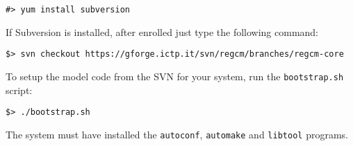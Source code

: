 \begin{verbatim}
#> yum install subversion
\end{verbatim}

If Subversion is installed, after enrolled just type the following command:

\begin{verbatim}
$> svn checkout https://gforge.ictp.it/svn/regcm/branches/regcm-core
\end{verbatim}

To setup the model code from the SVN for your system, run the
\verb=bootstrap.sh= script:

\begin{verbatim}
$> ./bootstrap.sh
\end{verbatim}

The system must have installed the \verb=autoconf=, \verb=automake= and
\verb=libtool= programs.
